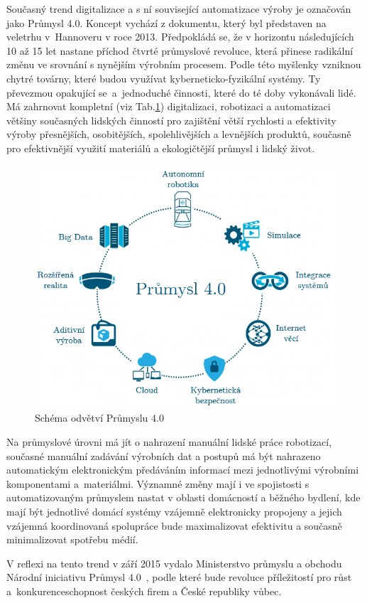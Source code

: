 Současný trend digitalizace a s ní související automatizace výroby je označován jako Průmysl 4.0. Koncept vychází z dokumentu, který byl představen na veletrhu v~Hannoveru v roce 2013. Předpokládá se, že v horizontu následujících 10 až 15 let nastane příchod čtvrté průmyslové revoluce, která přinese radikální změnu ve srovnání s nynějším výrobním procesem. Podle této myšlenky vzniknou chytré továrny, které budou využívat kyberneticko-fyzikální systémy. Ty převezmou opakující se~a~jednoduché činnosti, které do té doby vykonávali lidé. Má zahrnovat kompletní (viz Tab.\ref{SchemaPrumysl4}) digitalizaci, robotizaci a automatizaci většiny současných lidských činností pro zajištění větší rychlosti a efektivity výroby přesnějších, osobitějších, spolehlivějších a levnějších produktů, současně pro efektivnější využití materiálů a ekologičtější průmysl i lidský život.

\vspace{-10pt}	
	\begin{figure}[!ht]
  \begin{center}
   \includegraphics[scale=0.4]{obrazky/iot_industry4}
  \end{center}
	\vspace{-20pt}	
  \caption{Schéma odvětví Průmyslu 4.0}
	\label{SchemaPrumysl4}
\vspace{-10pt}	
\end{figure}



Na průmyslové úrovni má jít o nahrazení manuální lidské práce robotizací, současné manuální zadávání výrobních dat a postupů má být nahrazeno automatickým elektronickým předáváním informací mezi jednotlivými výrobními komponentami a~materiálmi. Významné změny mají i ve spojistosti s automatizovaným průmyslem nastat v oblasti domácností a běžného bydlení, kde mají být jednotlivé domácí systémy vzájemně elektronicky propojeny a jejich vzájemná koordinovaná spolupráce bude maximalizovat efektivitu a současně minimalizovat spotřebu médií.

V reflexi na tento trend v září 2015 vydalo Ministerstvo průmyslu a obchodu Národní iniciativu Průmysl 4.0~\cite{uvod_prumysl_4_pdf}, podle které bude revoluce příležitostí pro růst a~konkurenceschopnost českých firem a České republiky vůbec.









